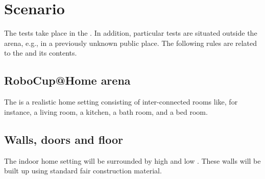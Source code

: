 \section{Scenario}
\label{sec:scenario}

The tests take place in the . In addition, particular tests are situated outside the arena, e.g., in a previously unknown public place. The following rules are related to the  and its contents. 

\subsection{RoboCup@Home arena}
The  is a realistic home setting consisting of inter-connected rooms like, for instance, a living room, a kitchen, a bath room, and a bed room. 



\subsection{Walls, doors and floor}
\label{rule:scenario_walls}

The indoor home setting will be surrounded by high and low . These walls will be built up using standard fair construction material.

